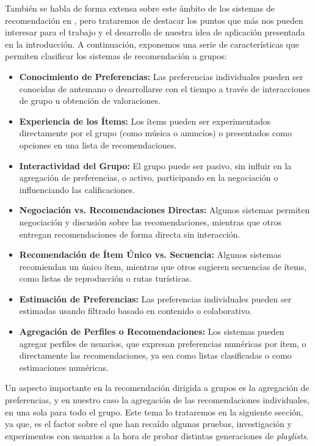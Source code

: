 También se habla de forma extensa sobre este ámbito de los sistemas de recomendación en \cite{grouprecommender}, pero trataremos de destacar los puntos
que más nos pueden interesar para el trabajo y el desarrollo de nuestra idea de aplicación presentada en la introducción. A continuación, exponemos
una serie de características que permiten clasificar los sistemas de recomendación a grupos:

\begin{itemize}
    \item \textbf{Conocimiento de Preferencias:} Las preferencias individuales pueden ser conocidas de antemano o desarrollarse con el tiempo a través 
    de interacciones de grupo u obtención de valoraciones.
    \item \textbf{Experiencia de los Ítems:} Los ítems pueden ser experimentados directamente por el grupo (como música o anuncios) o presentados como 
    opciones en una lista de recomendaciones.
    \item \textbf{Interactividad del Grupo:} El grupo puede ser pasivo, sin influir en la agregación de preferencias, o activo, participando en la 
    negociación o influenciando las calificaciones.
    \item \textbf{Negociación vs. Recomendaciones Directas:} Algunos sistemas permiten negociación y discusión sobre las recomendaciones, mientras que 
    otros entregan recomendaciones de forma directa sin interacción.
    \item \textbf{Recomendación de Ítem Único vs. Secuencia:} Algunos sistemas recomiendan un único ítem, mientras que otros sugieren secuencias de ítems,
     como listas de reproducción o rutas turísticas.
    \item \textbf{Estimación de Preferencias:} Las preferencias individuales pueden ser estimadas usando filtrado basado en contenido o colaborativo.
    \item \textbf{Agregación de Perfiles o Recomendaciones:} Los sistemas pueden agregar perfiles de usuarios, que expresan preferencias numéricas por ítem, 
    o directamente las recomendaciones, ya sea como listas clasificadas o como estimaciones numéricas.
\end{itemize}

Un aspecto importante en la recomendación dirigida a grupos es la agregación de preferencias, y en nuestro caso la agregación de las recomendaciones 
individuales, en una sola para todo el grupo. Este tema lo trataremos en la siguiente sección, ya que, es el factor sobre el que han recaído 
algunas pruebas, investigación y experimentos con usuarios a la hora de probar distintas generaciones de \textit{playlists}.

